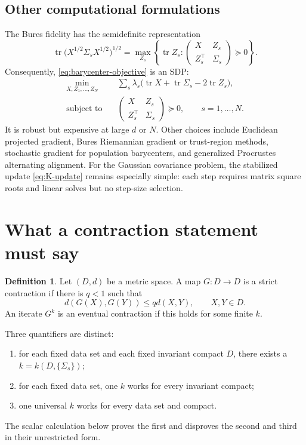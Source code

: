 \documentclass[11pt]{article}
\theoremstyle{definition}
\newtheorem{definition}[theorem]{Definition}
\newcommand{\tr}{\operatorname{tr}}
\begin{document}
\subsection{Other computational formulations}

The Bures fidelity has the semidefinite representation
\begin{equation}\label{eq:fidelity-sdp}
 \tr\bigl(X^{1/2}\Sigma_sX^{1/2}\bigr)^{1/2}
 =\max_{Z_s}\left\{\tr Z_s:
 \begin{pmatrix}X&Z_s\\Z_s^\top&\Sigma_s\end{pmatrix}\succeq0\right\}.
\end{equation}
Consequently, \eqref{eq:barycenter-objective} is an SDP:
\begin{equation}\label{eq:barycenter-sdp}
 \begin{aligned}
 \min_{X,Z_1,\ldots,Z_N}\quad&
 \sum_s\lambda_s\bigl(\tr X+\tr\Sigma_s-2\tr Z_s\bigr),\\
 \text{subject to}\quad&
 \begin{pmatrix}X&Z_s\\Z_s^\top&\Sigma_s\end{pmatrix}\succeq0,
 \qquad s=1,\ldots,N.
 \end{aligned}
\end{equation}
It is robust but expensive at large $d$ or $N$.  Other choices include
Euclidean projected gradient, Bures Riemannian gradient or trust-region
methods, stochastic gradient for population barycenters, and generalized
Procrustes alternating alignment.  For the Gaussian covariance problem, the
stabilized update \eqref{eq:K-update} remains especially simple: each step
requires matrix square roots and linear solves but no step-size selection.

\section{What a contraction statement must say}

\begin{definition}
Let $(D,d)$ be a metric space.  A map $G:D\to D$ is a strict contraction if
there is $q<1$ such that
\[
 d(G(X),G(Y))\leq qd(X,Y),\qquad X,Y\in D.
\]
An iterate $G^k$ is an eventual contraction if this holds for some finite $k$.
\end{definition}

Three quantifiers are distinct:
\begin{enumerate}
  \item for each fixed data set and each fixed invariant compact $D$, there
  exists a $k=k(D,\{\Sigma_s\})$;
  \item for each fixed data set, one $k$ works for every invariant compact;
  \item one universal $k$ works for every data set and compact.
\end{enumerate}
The scalar calculation below proves the first and disproves the second and
third in their unrestricted form.
\end{document}
